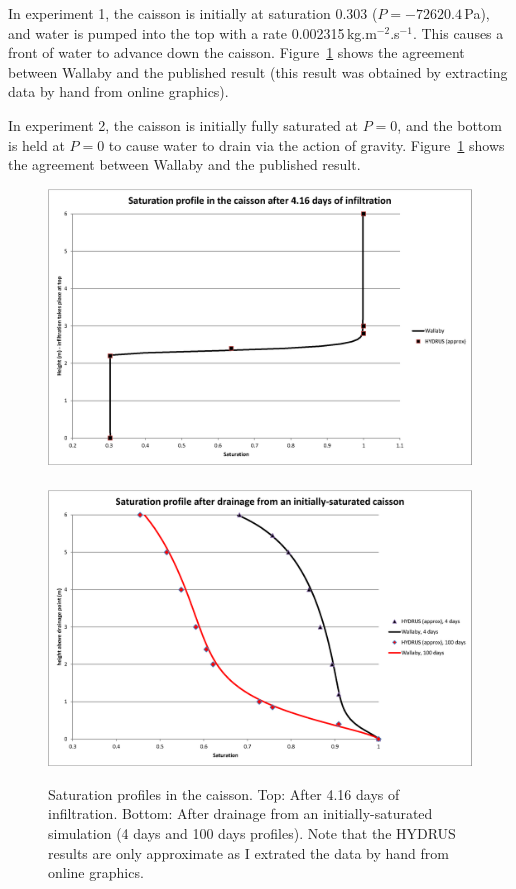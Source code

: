 \documentclass[]{scrreprt}
\begin{document}
In experiment 1, the caisson is initially at saturation 0.303
($P=-72620.4$\,Pa), and water is pumped into the top with a rate
0.002315\,kg.m$^{-2}$.s$^{-1}$.  This causes a front of water to
advance down the caisson.  Figure~\ref{rd.result.fig} shows the
agreement between Wallaby and the published result (this result was
obtained by extracting data by hand from online graphics).

In experiment 2, the caisson is initially fully saturated at $P=0$,
and the bottom is held at $P=0$ to cause water to drain via the action
of gravity.  Figure~\ref{rd.result.fig} shows the agreement between
Wallaby and the published result.


\begin{figure}[htb]
\begin{center}
\includegraphics[width=12cm]{rd01.eps} \\
$\mbox{}$\\
\includegraphics[width=12cm]{rd02.eps}
\caption{Saturation profiles in the caisson.  Top: After 4.16 days of
  infiltration.  Bottom: After drainage from an initially-saturated
  simulation (4 days and 100 days profiles).  Note that the HYDRUS
  results are only approximate as I extrated the data by hand from
  online graphics.}
\label{rd.result.fig}
\end{center}
\end{figure}
\end{document}
